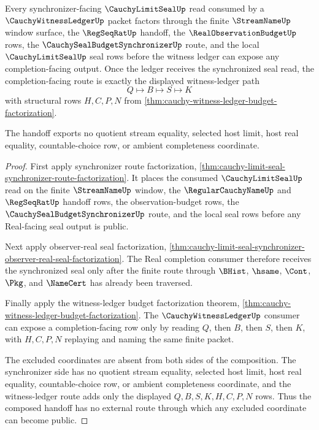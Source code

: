 \begin{theorem}
\label{thm:cauchy-limit-seal-witness-ledger-synchronizer-handoff}
Every synchronizer-facing $\CauchyLimitSealUp$ read consumed by a $\CauchyWitnessLedgerUp$ packet factors through the finite $\StreamNameUp$ window surface, the $\RegSeqRatUp$ handoff, the $\RealObservationBudgetUp$ rows, the $\CauchySealBudgetSynchronizerUp$ route, and the local $\CauchyLimitSealUp$ seal rows before the witness ledger can expose any completion-facing output. Once the ledger receives the synchronized seal read, the completion-facing route is exactly the displayed witness-ledger path
$$
Q \longmapsto B \longmapsto S \longmapsto K
$$
with structural rows $H,C,P,N$ from \autoref{thm:cauchy-witness-ledger-budget-factorization}.

The handoff exports no quotient stream equality, selected host limit, host real equality, countable-choice row, or ambient completeness coordinate.
\end{theorem}
\begin{proof}
First apply synchronizer route factorization, \autoref{thm:cauchy-limit-seal-synchronizer-route-factorization}. It places the consumed $\CauchyLimitSealUp$ read on the finite $\StreamNameUp$ window, the $\RegularCauchyNameUp$ and $\RegSeqRatUp$ handoff rows, the observation-budget rows, the $\CauchySealBudgetSynchronizerUp$ route, and the local seal rows before any Real-facing seal output is public.

Next apply observer-real seal factorization, \autoref{thm:cauchy-limit-seal-synchronizer-observer-real-seal-factorization}. The Real completion consumer therefore receives the synchronized seal only after the finite route through $\BHist$, $\hsame$, $\Cont$, $\Pkg$, and $\NameCert$ has already been traversed.

Finally apply the witness-ledger budget factorization theorem, \autoref{thm:cauchy-witness-ledger-budget-factorization}. The $\CauchyWitnessLedgerUp$ consumer can expose a completion-facing row only by reading $Q$, then $B$, then $S$, then $K$, with $H,C,P,N$ replaying and naming the same finite packet.

The excluded coordinates are absent from both sides of the composition. The synchronizer side has no quotient stream equality, selected host limit, host real equality, countable-choice row, or ambient completeness coordinate, and the witness-ledger route adds only the displayed $Q,B,S,K,H,C,P,N$ rows. Thus the composed handoff has no external route through which any excluded coordinate can become public.
\end{proof}

